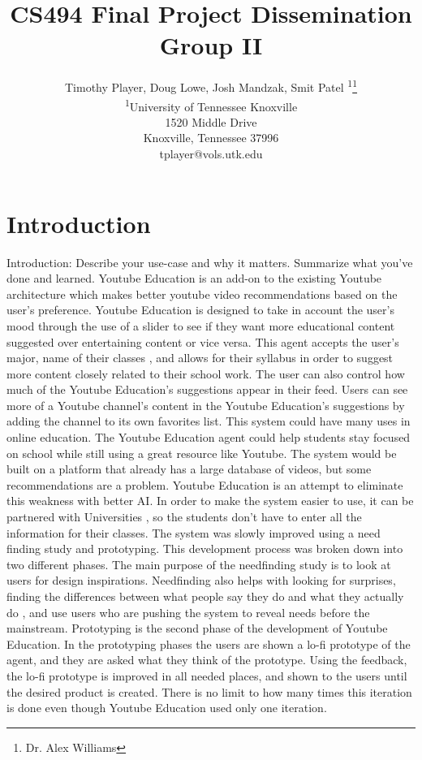 \documentclass[letterpaper]{article} %
\title{CS494 Final Project Dissemination Group II}
\author{Timothy Player, Doug Lowe, Josh Mandzak, Smit Patel \textsuperscript{\rm 1}\thanks{Dr. Alex Williams}\\ %
\textsuperscript{\rm 1}University of Tennessee Knoxville\\ %
1520 Middle Drive\\
Knoxville, Tennessee  37996\\
tplayer@vols.utk.edu %
}
\begin{document}
\maketitle
\section{Introduction}
Introduction: Describe your use-case and why it matters. Summarize what you've done and learned.
Youtube Education is an add-on to the existing Youtube architecture which makes better youtube video recommendations based on the user’s preference. Youtube Education is designed to take in account the user’s mood through the use of a slider to see if they want more educational content suggested over entertaining content or vice versa. This agent accepts the user’s major, name of their classes , and allows for their syllabus in order to suggest more content closely related to their school work. The user can also control how much of the Youtube Education’s suggestions appear in their feed. Users can see more of a Youtube channel’s content in the Youtube Education’s suggestions by adding the channel to its own favorites list. 
	This system could have many uses in online education. The Youtube Education agent could help students stay focused on school while still using a great resource like Youtube. The system would be built on a platform that already has a large database of videos, but some recommendations are a problem. Youtube Education is an attempt to eliminate this weakness with better AI. In order to make the system easier to use, it can be partnered with Universities , so the students don’t have to enter all the information for their classes. The system was slowly improved using a need finding study and prototyping. 
	This development process was broken down into two different phases. The main purpose of the needfinding study is to look at users for design inspirations. Needfinding also helps with looking for surprises, finding the differences between what people say they do and what they actually do , and use users who are pushing the system to reveal needs before the mainstream. Prototyping is the second phase of the development of Youtube Education. In the prototyping phases the users are shown a lo-fi prototype of the agent, and they are asked what they think of the prototype. Using the feedback, the lo-fi prototype is improved in all needed places, and shown to the users until the desired product is created.  There is no limit to how many times this iteration is done even though Youtube Education used only one iteration.
\end{document}
